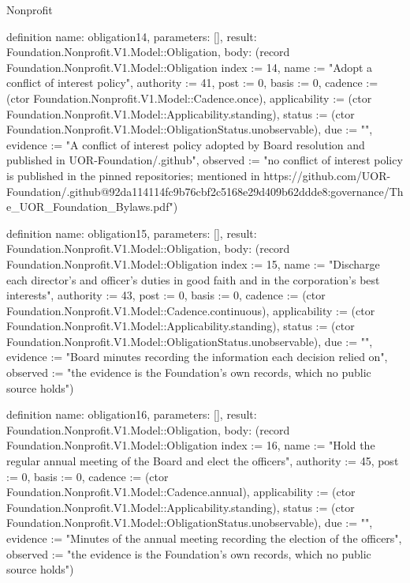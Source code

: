 \begin{lexlean}{Nonprofit}
\begin{semanticmodule}
definition{
  name: obligation14,
  parameters: [],
  result: Foundation.Nonprofit.V1.Model::Obligation,
  body: (record Foundation.Nonprofit.V1.Model::Obligation {index := 14, name := "Adopt a conflict of interest policy", authority := 41, post := 0, basis := 0, cadence := (ctor Foundation.Nonprofit.V1.Model::Cadence.once), applicability := (ctor Foundation.Nonprofit.V1.Model::Applicability.standing), status := (ctor Foundation.Nonprofit.V1.Model::ObligationStatus.unobservable), due := "", evidence := "A conflict of interest policy adopted by Board resolution and published in UOR-Foundation/.github", observed := "no conflict of interest policy is published in the pinned repositories; mentioned in https://github.com/UOR-Foundation/.github@92da114114fc9b76cbf2c5168e29d409b62ddde8:governance/The_UOR_Foundation_Bylaws.pdf"})
}

definition{
  name: obligation15,
  parameters: [],
  result: Foundation.Nonprofit.V1.Model::Obligation,
  body: (record Foundation.Nonprofit.V1.Model::Obligation {index := 15, name := "Discharge each director's and officer's duties in good faith and in the corporation's best interests", authority := 43, post := 0, basis := 0, cadence := (ctor Foundation.Nonprofit.V1.Model::Cadence.continuous), applicability := (ctor Foundation.Nonprofit.V1.Model::Applicability.standing), status := (ctor Foundation.Nonprofit.V1.Model::ObligationStatus.unobservable), due := "", evidence := "Board minutes recording the information each decision relied on", observed := "the evidence is the Foundation’s own records, which no public source holds"})
}

definition{
  name: obligation16,
  parameters: [],
  result: Foundation.Nonprofit.V1.Model::Obligation,
  body: (record Foundation.Nonprofit.V1.Model::Obligation {index := 16, name := "Hold the regular annual meeting of the Board and elect the officers", authority := 45, post := 0, basis := 0, cadence := (ctor Foundation.Nonprofit.V1.Model::Cadence.annual), applicability := (ctor Foundation.Nonprofit.V1.Model::Applicability.standing), status := (ctor Foundation.Nonprofit.V1.Model::ObligationStatus.unobservable), due := "", evidence := "Minutes of the annual meeting recording the election of the officers", observed := "the evidence is the Foundation’s own records, which no public source holds"})
}


\end{semanticmodule}
\end{lexlean}
